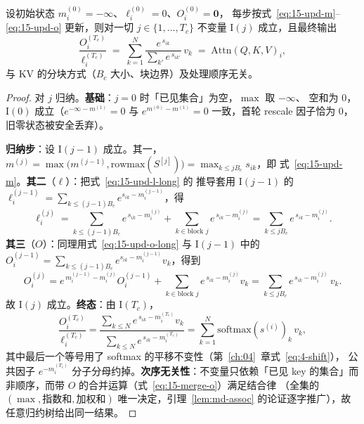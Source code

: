 \begin{theorem}\label{thm:15-invariant}
  设初始状态 $m^{(0)}_i = -\infty$、$\ell^{(0)}_i = 0$、$O^{(0)}_i = \mathbf{0}$，
  每步按式~\ref{eq:15-upd-m}--\ref{eq:15-upd-o} 更新，则对一切
  $j \in \{1, \dots, T_c\}$ 不变量 $\mathrm{I}(j)$ 成立，且最终输出
  \begin{equation}
    \frac{O^{(T_c)}_i}{\ell^{(T_c)}_i}
    \;=\; \sum_{k=1}^{N} \frac{e^{\,s_{ik}}}{\sum_{k'} e^{\,s_{ik'}}}\, v_k
    \;=\; \mathrm{Attn}(Q,K,V)_i ,
  \end{equation}
  与 KV 的分块方式（$B_c$ 大小、块边界）及处理顺序无关。
\end{theorem}

\begin{proof}
  对 $j$ 归纳。\textbf{基础}：$j = 0$ 时「已见集合」为空，$\max$ 取 $-\infty$、
  空和为 $0$，$\mathrm{I}(0)$ 成立（$e^{-\infty - m^{(1)}} = 0$ 与
  $e^{m^{(0)} - m^{(1)}} = 0$ 一致，首轮 rescale 因子恰为 $0$，旧零状态被安全丢弃）。

  \textbf{归纳步}：设 $\mathrm{I}(j{-}1)$ 成立。其一，$m^{(j)} = \max\bigl(
  m^{(j-1)}, \mathrm{rowmax}(S^{[j]})\bigr) = \max_{k \le jB_c} s_{ik}$，即
  式~\ref{eq:15-upd-m}。\textbf{其二}（$\ell$）：把式~\ref{eq:15-upd-l-long} 的
  推导套用 $\mathrm{I}(j{-}1)$ 的 $\ell^{(j-1)}_i = \sum_{k \le (j-1)B_c}
  e^{s_{ik} - m^{(j-1)}_i}$，得
  \begin{equation*}
    \ell^{(j)}_i = \sum_{k \le (j{-}1)B_c} e^{\,s_{ik} - m^{(j)}_i}
    + \sum_{k \in \text{block } j} e^{\,s_{ik} - m^{(j)}_i}
    = \sum_{k \le jB_c} e^{\,s_{ik} - m^{(j)}_i} .
  \end{equation*}
  \textbf{其三}（$O$）：同理用式~\ref{eq:15-upd-o-long} 与 $\mathrm{I}(j{-}1)$ 中的
  $O^{(j-1)}_i = \sum_{k \le (j-1)B_c} e^{s_{ik} - m^{(j-1)}_i} v_k$，得到
  \begin{equation*}
    O^{(j)}_i = e^{\,m^{(j-1)}_i - m^{(j)}_i} O^{(j-1)}_i
    + \sum_{k \in \text{block } j} e^{\,s_{ik} - m^{(j)}_i} v_k
    = \sum_{k \le jB_c} e^{\,s_{ik} - m^{(j)}_i}\, v_k .
  \end{equation*}
  故 $\mathrm{I}(j)$ 成立。\textbf{终态}：由 $\mathrm{I}(T_c)$，
  \begin{equation*}
    \frac{O^{(T_c)}_i}{\ell^{(T_c)}_i}
    = \frac{\sum_{k \le N} e^{\,s_{ik} - m^{(T_c)}_i} v_k}
           {\sum_{k \le N} e^{\,s_{ik} - m^{(T_c)}_i}}
    = \sum_{k=1}^{N} \mathrm{softmax}(s^{(i)})_k\, v_k ,
  \end{equation*}
  其中最后一个等号用了 softmax 的平移不变性（第~\ref{ch:04}~章式~\ref{eq:4-shift}），
  公共因子 $e^{-m^{(T_c)}_i}$ 分子分母约掉。\textbf{次序无关性}：不变量只依赖「已见
  key 的集合」而非顺序，而带 $O$ 的合并运算（式~\ref{eq:15-merge-o}）满足结合律
  （全集的 $(\max, \text{指数和}, \text{加权和})$ 唯一决定，引理~\ref{lem:md-assoc}
  的论证逐字推广），故任意归约树给出同一结果。
\end{proof}

